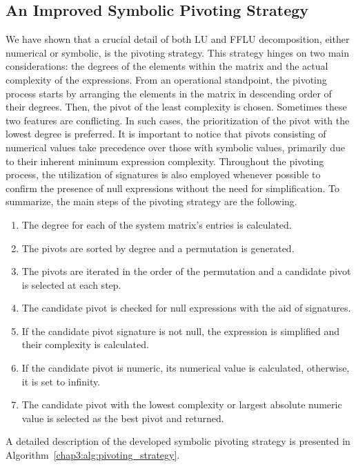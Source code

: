 \subsection{An Improved Symbolic Pivoting Strategy}

We have shown that a crucial detail of both \ac{LU} and \ac{FFLU} decomposition, either numerical or symbolic, is the pivoting strategy. This strategy hinges on two main considerations: the degrees of the elements within the matrix and the actual complexity of the expressions. From an operational standpoint, the pivoting process starts by arranging the elements in the matrix in descending order of their degrees. Then, the pivot of the least complexity is chosen. Sometimes these two features are conflicting. In such cases, the prioritization of the pivot with the lowest degree is preferred. It is important to notice that pivots consisting of numerical values take precedence over those with symbolic values, primarily due to their inherent minimum expression complexity. Throughout the pivoting process, the utilization of signatures is also employed whenever possible to confirm the presence of null expressions without the need for simplification. To summarize, the main steps of the pivoting strategy are the following.
%
\begin{enumerate}
  \setlength{\itemsep}{0.0em}
  \item The degree for each of the system matrix's entries is calculated.
  \item The pivots are sorted by degree and a permutation is generated.
  \item The pivots are iterated in the order of the permutation and a candidate pivot is selected at each step.
  \item The candidate pivot is checked for null expressions with the aid of signatures.
  \item If the candidate pivot signature is not null, the expression is simplified and their complexity is calculated.
  \item If the candidate pivot is numeric, its numerical value is calculated, otherwise, it is set to infinity.
  \item The candidate pivot with the lowest complexity or largest absolute numeric value is selected as the best pivot and returned.
\end{enumerate}
%
A detailed description of the developed symbolic pivoting strategy is presented in Algorithm~\ref{chap3:alg:pivoting_strategy}.

